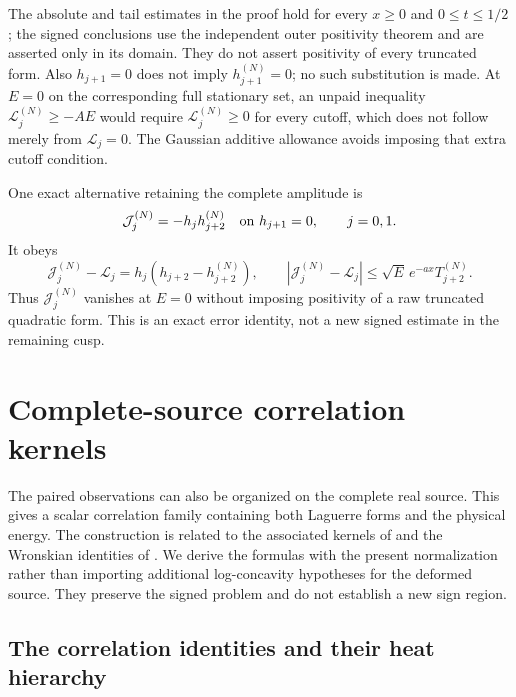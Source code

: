 \documentclass[11pt]{article}
\numberwithin{equation}{section}
\theoremstyle{definition}
\theoremstyle{remark}
\newcommand{\Lag}{\mathcal L}
\begin{document}
The absolute and tail estimates in the proof hold for every $x\ge0$
and $0\le t\le1/2$; the signed conclusions use the independent outer
positivity theorem and are asserted only in its domain. They do not
assert positivity of every truncated form. Also $h_{j+1}=0$ does not
imply $h_{j+1}^{(N)}=0$; no such substitution is made. At $E=0$ on the corresponding full stationary set, an unpaid inequality $\Lag_j^{(N)}\ge-AE$ would require
$\Lag_j^{(N)}\ge0$ for every cutoff, which does not follow merely from
$\Lag_j=0$. The Gaussian additive allowance avoids imposing that extra
cutoff condition.

One exact alternative retaining the complete amplitude is
\[
 \mathcal J_j^{(N)}=-h_jh_{j+2}^{(N)}
 \quad\hbox{on }h_{j+1}=0,\qquad j=0,1.
\]
It obeys
\begin{equation}
 \mathcal J_j^{(N)}-\Lag_j=h_j(h_{j+2}-h_{j+2}^{(N)}),\qquad
 |\mathcal J_j^{(N)}-\Lag_j|
       \le\sqrt E\,e^{-ax}T_{j+2}^{(N)}.
 \label{eq:full-amplitude-cutoff-error}
\end{equation}
Thus $\mathcal J_j^{(N)}$ vanishes at $E=0$ without imposing positivity
of a raw truncated quadratic form. This is an exact error identity,
not a new signed estimate in the remaining cusp.


\section{Complete-source correlation kernels}
\label{sec:complete-correlations}

The paired observations can also be organized on the complete real
source.  This gives a scalar correlation family containing both
Laguerre forms and the physical energy.  The construction is related
to the associated kernels of \cite[Theorem~3.7]{csordas} and the
Wronskian identities of \cite[Theorem~1.3]{dimitrovxu}.
We derive the formulas with the present normalization rather than
importing additional log-concavity hypotheses for the deformed source.
They preserve the signed problem and do not establish a new sign region.

\subsection{The correlation identities and their heat hierarchy}
\end{document}
